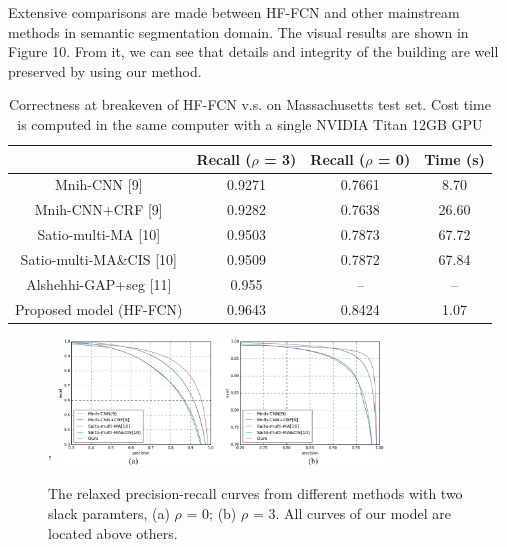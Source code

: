 Extensive comparisons are made between HF-FCN and other mainstream methods in semantic segmentation domain. The visual results are shown in Figure 10. From it, we can see that details and integrity of the building are well preserved by using our method.
\begin{table}
\centering
\caption {Correctness at breakeven of HF-FCN v.s. \cite{IEEEexample:mnih2013machine}\cite{IEEEexample:saito2016multiple}\cite{IEEEexample:alshehhi2017simultaneous} on Massachusetts test set. Cost time is computed in the same computer with a single NVIDIA Titan 12GB GPU}
\begin{tabular}{cccc}
\hline
&Recall ($\rho$ = 3)&Recall ($\rho$ = 0)&Time (s)\\
\hline
Mnih-CNN [9]&0.9271&0.7661&8.70\\
Mnih-CNN+CRF [9]&0.9282&0.7638&26.60\\
Satio-multi-MA [10]&0.9503&0.7873&67.72\\
Satio-multi-MA\&CIS [10]&0.9509&0.7872&67.84\\
Alshehhi-GAP+seg [11]&0.955&{--}&{--} \\
Proposed model (HF-FCN)&0.9643&0.8424&1.07\\ \hline
\end{tabular}
\end{table}

\begin{figure}
\centering'
\includegraphics[width=8.7cm]{Figures/HF-FCN_dataset_a.eps}
\caption{The relaxed precision-recall curves from different methods with two slack paramters, (a) $\rho$ = 0; (b) $\rho$ = 3. All curves of our model are located above others.}
\label{7}
\end{figure} 


